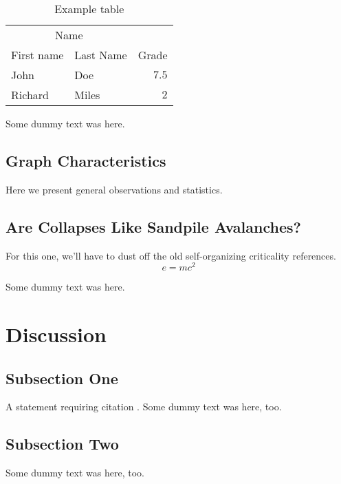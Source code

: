 \documentclass[twoside,twocolumn]{article}
\begin{document}
\begin{table}
\caption{Example table}
\centering
\begin{tabular}{llr}
\toprule
\multicolumn{2}{c}{Name} \\
\cmidrule(r){1-2}
First name & Last Name & Grade \\
\midrule
John & Doe & $7.5$ \\
Richard & Miles & $2$ \\
\bottomrule
\end{tabular}
\end{table}

Some dummy text was here.

\subsection{Graph Characteristics}

Here we present general observations and statistics.

\subsection{Are Collapses Like Sandpile Avalanches?}

For this one, we'll have to dust off the old self-organizing criticality
references.
\begin{equation}
\label{eq:emc}
e = mc^2
\end{equation}

Some dummy text was here.


\section{Discussion}

\subsection{Subsection One}

A statement requiring citation \cite{Figueredo:2009dg}.
Some dummy text was here, too.

\subsection{Subsection Two}

Some dummy text was here, too.

\end{document}
